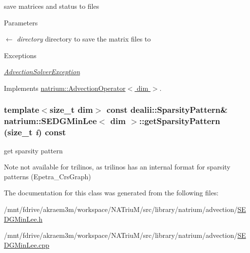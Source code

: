 save matrices and status to files 
\begin{DoxyParams}{Parameters}
\item[\mbox{$\leftarrow$} {\em directory}]directory to save the matrix files to \end{DoxyParams}

\begin{DoxyExceptions}{Exceptions}
\item[{\em \hyperlink{classnatrium_1_1AdvectionSolverException}{AdvectionSolverException}}]\end{DoxyExceptions}


Implements \hyperlink{classnatrium_1_1AdvectionOperator_a251e21d1dd023926d4c5f7fd973b90bf}{natrium::AdvectionOperator$<$ dim $>$}.\hypertarget{classnatrium_1_1SEDGMinLee_ac9392932aaab8186b427b9d12bc64771}{
\subsubsection[{getSparsityPattern}]{\setlength{\rightskip}{0pt plus 5cm}template$<$size\_\-t dim$>$ const dealii::SparsityPattern\& {\bf natrium::SEDGMinLee}$<$ dim $>$::getSparsityPattern (size\_\-t {\em i}) const}}
\label{classnatrium_1_1SEDGMinLee_ac9392932aaab8186b427b9d12bc64771}


get sparsity pattern \begin{DoxyNote}{Note}
not available for trilinos, as trilinos has an internal format for sparsity patterns (Epetra\_\-CrsGraph) 
\end{DoxyNote}


The documentation for this class was generated from the following files:\begin{DoxyCompactItemize}
\item 
/mnt/fdrive/akraem3m/workspace/NATriuM/src/library/natrium/advection/\hyperlink{SEDGMinLee_8h}{SEDGMinLee.h}\item 
/mnt/fdrive/akraem3m/workspace/NATriuM/src/library/natrium/advection/\hyperlink{SEDGMinLee_8cpp}{SEDGMinLee.cpp}\end{DoxyCompactItemize}
